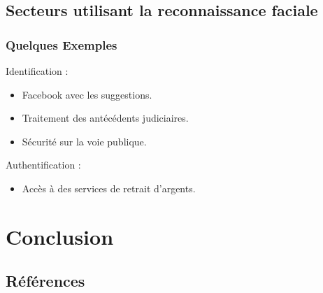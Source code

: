 \documentclass{beamer}
\theoremstyle{plain}
\theoremstyle{definition}
\begin{document}
\subsection{Secteurs utilisant la reconnaissance faciale}
\begin{frame}
  \frametitle{Quelques Exemples}
  Identification :
  \begin{itemize}
  \item <2-> Facebook avec les suggestions.
  \item <4-> Traitement des antécédents judiciaires.
  \item <5-> Sécurité sur la voie publique.
  \end{itemize}

  Authentification :
  \begin{itemize}
  \item <3-> Accès à des services de retrait d'argents.
  \end{itemize}  
\end{frame}



\section{Conclusion}
\begin{frame}
\end{frame}



\subsection{Références}
\begin{frame}  
\end{frame}
\end{document}
